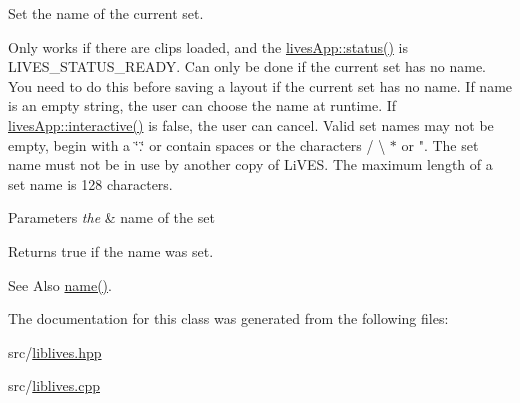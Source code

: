 Set the name of the current set. 

Only works if there are clips loaded, and the \hyperlink{classlives_1_1livesApp_afcb05464af9146f5efbb896f2611c8e7}{lives\-App\-::status()} is L\-I\-V\-E\-S\-\_\-\-S\-T\-A\-T\-U\-S\-\_\-\-R\-E\-A\-D\-Y. Can only be done if the current set has no name. You need to do this before saving a layout if the current set has no name. If name is an empty string, the user can choose the name at runtime. If \hyperlink{classlives_1_1livesApp_a33b85eae23bbb5e55c9843b9016dcff9}{lives\-App\-::interactive()} is false, the user can cancel. Valid set names may not be empty, begin with a \char`\"{}.\char`\"{} or contain spaces or the characters / \textbackslash{} $\ast$ or ". The set name must not be in use by another copy of Li\-V\-E\-S. The maximum length of a set name is 128 characters. 
\begin{DoxyParams}{Parameters}
{\em the} & name of the set \\
\hline
\end{DoxyParams}
\begin{DoxyReturn}{Returns}
true if the name was set. 
\end{DoxyReturn}
\begin{DoxySeeAlso}{See Also}
\hyperlink{classlives_1_1set_a800ff7b6410dacdf6a4a7bf164b30709}{name()}. 
\end{DoxySeeAlso}


The documentation for this class was generated from the following files\-:\begin{DoxyCompactItemize}
\item 
src/\hyperlink{liblives_8hpp}{liblives.\-hpp}\item 
src/\hyperlink{liblives_8cpp}{liblives.\-cpp}\end{DoxyCompactItemize}
